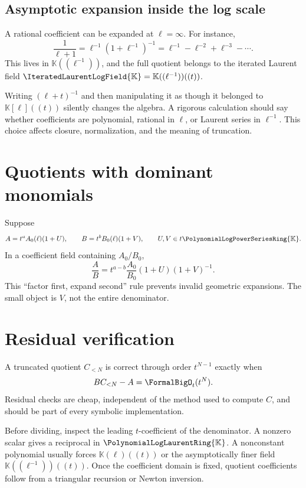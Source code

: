 \documentclass[11pt,oneside,openany]{book}
\newcommand{\K}{\mathbb{K}}
\newcommand{\Rring}{\PolynomialLogPowerSeriesRing{\K}}
\newcommand{\Pring}{\PolynomialLogLaurentRing{\K}}
\newcommand{\Fring}{\IteratedLaurentLogField{\K}}
\begin{document}
\subsection{Asymptotic expansion inside the log scale}
A rational coefficient can be expanded at \(\ell=\infty\).  For instance,
\begin{equation}\label{eq:rationalell}
 \frac{1}{\ell+1}
 =\ell^{-1}\left(1+\ell^{-1}\right)^{-1}
 =\ell^{-1}-\ell^{-2}+\ell^{-3}-\cdots.
\end{equation}
This lives in \(\K((\ell^{-1}))\), and the full quotient belongs to the
iterated Laurent field \(\Fring=\K((\ell^{-1}))((t))\).

\begin{cautionbox}
Writing \((\ell+t)^{-1}\) and then manipulating it as though it belonged to
\(\K[\ell]((t))\) silently changes the algebra.  A rigorous calculation should
say whether coefficients are polynomial, rational in \(\ell\), or Laurent
series in \(\ell^{-1}\).  This choice affects closure, normalization, and the
meaning of truncation.
\end{cautionbox}

\section{Quotients with dominant monomials}
Suppose
\[
 A=t^aA_0(\ell)(1+U),
 \qquad
 B=t^bB_0(\ell)(1+V),
 \qquad U,V\in t\Rring.
\]
In a coefficient field containing \(A_0/B_0\),
\begin{equation}\label{eq:generalquotient}
 \frac AB=t^{a-b}\frac{A_0}{B_0}(1+U)(1+V)^{-1}.
\end{equation}
This ``factor first, expand second'' rule prevents invalid geometric expansions.
The small object is \(V\), not the entire denominator.

\section{Residual verification}
A truncated quotient \(C_{<N}\) is correct through order \(t^{N-1}\) exactly
when
\begin{equation}\label{eq:divisionresidual}
 BC_{<N}-A=\FormalBigO_t(t^N).
\end{equation}
Residual checks are cheap, independent of the method used to compute \(C\), and
should be part of every symbolic implementation.

\begin{summarybox}
Before dividing, inspect the leading \(t\)-coefficient of the denominator.
A nonzero scalar gives a reciprocal in \(\Pring\).  A nonconstant polynomial
usually forces \(\K(\ell)((t))\) or the asymptotically finer field
\(\K((\ell^{-1}))((t))\).  Once the coefficient domain is fixed, quotient
coefficients follow from a triangular recursion or Newton inversion.
\end{summarybox}
\end{document}
